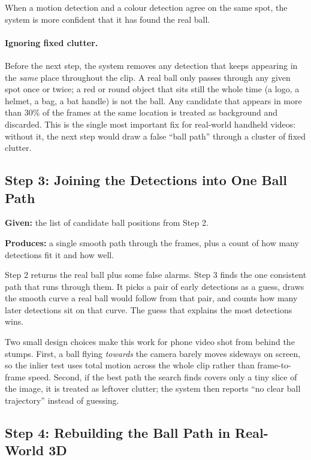 \documentclass[12pt,a4paper]{report}
\begin{document}
When a motion detection and a colour detection agree on the same spot, the system is more confident that it has found the real ball.

\paragraph{Ignoring fixed clutter.}
Before the next step, the system removes any detection that keeps appearing in the \emph{same} place throughout the clip. A real ball only passes through any given spot once or twice; a red or round object that sits still the whole time (a logo, a helmet, a bag, a bat handle) is not the ball. Any candidate that appears in more than 30\% of the frames at the same location is treated as background and discarded. This is the single most important fix for real-world handheld videos: without it, the next step would draw a false ``ball path'' through a cluster of fixed clutter.

\subsection{Step 3: Joining the Detections into One Ball Path}

\textbf{Given:} the list of candidate ball positions from Step 2.

\textbf{Produces:} a single smooth path through the frames, plus a count of how many detections fit it and how well.

Step 2 returns the real ball plus some false alarms. Step 3 finds the one consistent path that runs through them. It picks a pair of early detections as a guess, draws the smooth curve a real ball would follow from that pair, and counts how many later detections sit on that curve. The guess that explains the most detections wins.

Two small design choices make this work for phone video shot from behind the stumps. First, a ball flying \emph{towards} the camera barely moves sideways on screen, so the inlier test uses total motion across the whole clip rather than frame-to-frame speed. Second, if the best path the search finds covers only a tiny slice of the image, it is treated as leftover clutter; the system then reports ``no clear ball trajectory'' instead of guessing.

\subsection{Step 4: Rebuilding the Ball Path in Real-World 3D}
\end{document}
